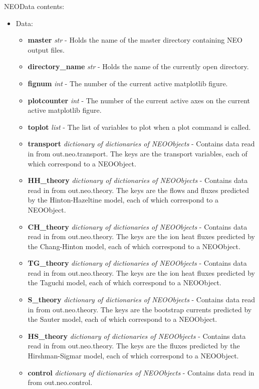 \documentclass{article}
\begin{document}
\newpage

NEOData contents:
\begin{itemize}
\item Data:
\begin{itemize}
\item \textbf{master} \emph{str} - Holds the name of the master directory containing NEO output files.
\item \textbf{directory\_name} \emph{str} - Holds the name of the currently open directory.
\item \textbf{fignum} \emph{int} - The number of the current active matplotlib figure.
\item \textbf{plotcounter} \emph{int} - The number of the current active axes on the current active matplotlib figure.
\item \textbf{toplot} \emph{list} - The list of variables to plot when a plot command is called.
\item \textbf{transport} \emph{dictionary of dictionaries of NEOObjects} - Contains data read in from out.neo.transport.  The keys are the transport variables, each of which correspond to a NEOObject.
\item \textbf{HH\_theory} \emph{dictionary of dictionaries of NEOObjects} - Contains data read in from out.neo.theory.  The keys are the flows and fluxes predicted by the Hinton-Hazeltine model, each of which correspond to a NEOObject.
\item \textbf{CH\_theory} \emph{dictionary of dictionaries of NEOObjects} - Contains data read in from out.neo.theory.  The keys are the ion heat fluxes predicted by the Chang-Hinton model, each of which correspond to a NEOObject.
\item \textbf{TG\_theory} \emph{dictionary of dictionaries of NEOObjects} - Contains data read in from out.neo.theory.  The keys are the ion heat fluxes predicted by the Taguchi model, each of which correspond to a NEOObject.
\item \textbf{S\_theory} \emph{dictionary of dictionaries of NEOObjects} - Contains data read in from out.neo.theory. The keys are the bootstrap currents predicted by the Sauter model, each of which correspond to a NEOObject.
\item \textbf{HS\_theory} \emph{dictionary of dictionaries of NEOObjects} - Contains data read in from out.neo.theory.  The keys are the fluxes predicted by the Hirshman-Sigmar model, each of which  correspond to a NEOObject.
\item \textbf{control} \emph{dictionary of dictionaries of NEOObjects} - Contains data read in from out.neo.control.

\end{itemize}
\end{itemize}
\end{document}
